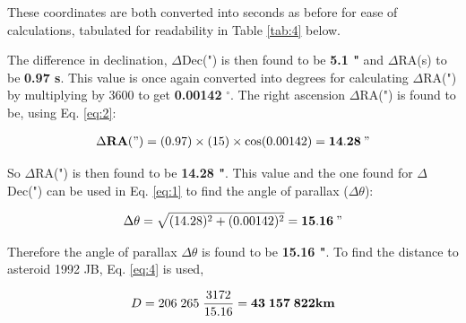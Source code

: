 \documentclass[12pt]{article}
\begin{document}
These coordinates are both converted into seconds as before for ease of calculations, tabulated for readability in Table \ref{tab:4} below.

\begin{table}[H]
    \centering
    \caption{Table of coordinate measurements for 1992 JB asteroid for ATEAST and ATWEST.}
    \label{tab:4}
\end{table}

The difference in declination, $\Delta$Dec(") is then found to be \textbf{5.1 "} and $\Delta$RA(s) to be \textbf{0.97 s}. This value is once again converted into degrees for calculating $\Delta$RA(") by multiplying by 3600 to get \textbf{0.00142} $^{\circ}$. 
The right ascension $\Delta$RA(") is found to be, using Eq. \ref{eq:2}:

\vspace{-2ex}
\begin{gather*}
    \Delta \textbf{RA} (") = (0.97) \times (15) \times \cos (0.00142) = \mathbf{14.28} \: "
\end{gather*}

So $\Delta$RA(") is then found to be \textbf{14.28 "}. This value and the one found for $\Delta$Dec(") can be used in Eq. \ref{eq:1} to find the angle of parallax ($\Delta \theta$):

\vspace{-2ex}
\begin{gather*}
    \Delta \theta = \sqrt{(14.28)^2 + (0.00142)^2} = \mathbf{15.16} \: "
\end{gather*}

Therefore the angle of parallax $\Delta \theta$ is found to be \textbf{15.16 "}. To find the distance to asteroid 1992 JB, Eq. \ref{eq:4} is used,

\vspace{-2ex}
\begin{gather*}
    D = 206 \; 265 \; \frac{3172}{15.16} = \mathbf{43 \; 157 \; 822} \text{\textbf{km}}
\end{gather*}
\end{document}
